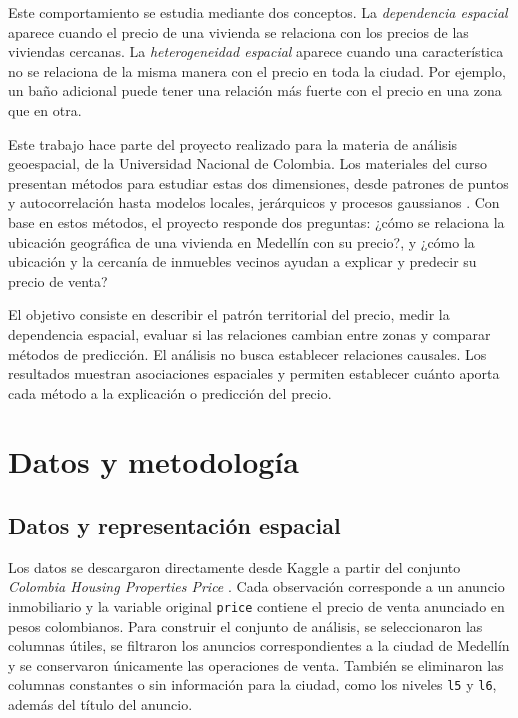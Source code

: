 \documentclass[conference]{IEEEtran}
\begin{document}
Este comportamiento se estudia mediante dos conceptos. La \emph{dependencia espacial} aparece cuando el precio de una vivienda se relaciona con los precios de las viviendas cercanas. La \emph{heterogeneidad espacial} aparece cuando una característica no se relaciona de la misma manera con el precio en toda la ciudad. Por ejemplo, un baño adicional puede tener una relación más fuerte con el precio en una zona que en otra.

Este trabajo hace parte del proyecto realizado para la materia de análisis geoespacial, de la Universidad Nacional de Colombia. Los materiales del curso presentan métodos para estudiar estas dos dimensiones, desde patrones de puntos y autocorrelación hasta modelos locales, jerárquicos y procesos gaussianos \cite{materialcurso,librocurso}. Con base en estos métodos, el proyecto responde dos preguntas: ¿cómo se relaciona la ubicación geográfica de una vivienda en Medellín con su precio?, y ¿cómo la ubicación y la cercanía de inmuebles vecinos ayudan a explicar y predecir su precio de venta?

El objetivo consiste en describir el patrón territorial del precio, medir la dependencia espacial, evaluar si las relaciones cambian entre zonas y comparar métodos de predicción. El análisis no busca establecer relaciones causales. Los resultados muestran asociaciones espaciales y permiten establecer cuánto aporta cada método a la explicación o predicción del precio.

\section{Datos y metodología}

\subsection{Datos y representación espacial}

Los datos se descargaron directamente desde Kaggle a partir del conjunto \emph{Colombia Housing Properties Price} \cite{dataset}. Cada observación corresponde a un anuncio inmobiliario y la variable original \texttt{price} contiene el precio de venta anunciado en pesos colombianos. Para construir el conjunto de análisis, se seleccionaron las columnas útiles, se filtraron los anuncios correspondientes a la ciudad de Medellín y se conservaron únicamente las operaciones de venta. También se eliminaron las columnas constantes o sin información para la ciudad, como los niveles \texttt{l5} y \texttt{l6}, además del título del anuncio.
\end{document}
